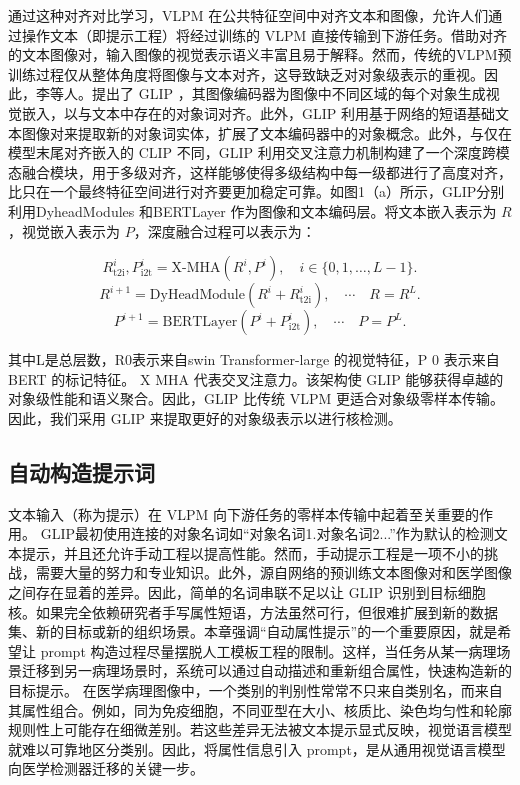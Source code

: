 通过这种对齐对比学习，VLPM 在公共特征空间中对齐文本和图像，允许人们通过操作文本（即提示工程）将经过训练的 VLPM 直接传输到下游任务。借助对齐的文本图像对，输入图像的视觉表示语义丰富且易于解释。然而，传统的VLPM预训练过程仅从整体角度将图像与文本对齐，这导致缺乏对对象级表示的重视。因此，李等人。提出了 GLIP \cite{li2022grounded}，其图像编码器为图像中不同区域的每个对象生成视觉嵌入，以与文本中存在的对象词对齐。此外，GLIP 利用基于网络的短语基础文本图像对来提取新的对象词实体，扩展了文本编码器中的对象概念。此外，与仅在模型末尾对齐嵌入的 CLIP 不同，GLIP 利用交叉注意力机制构建了一个深度跨模态融合模块\cite{chen2021crossvit}，用于多级对齐，这样能够使得多级结构中每一级都进行了高度对齐，比只在一个最终特征空间进行对齐要更加稳定可靠。如图1（a）所示，GLIP分别利用DyheadModules \cite{dai2021dynamic}和BERTLayer \cite{devlin2018bert}作为图像和文本编码层。将文本嵌入表示为 $R$，视觉嵌入表示为 $P$，深度融合过程可以表示为：

\begin{equation}
\label{eq:glip_xmha}
R_{\mathrm{t}2\mathrm{i}}^{i}, P_{\mathrm{i}2\mathrm{t}}^{i}=\mathrm{X\text{-}MHA}\left(R^{i}, P^{i}\right),\quad i \in\{0,1, \ldots, L-1\}.
\end{equation}
\begin{equation}
\label{eq:glip_dyhead}
R^{i+1}=\mathrm{DyHeadModule}\left(R^{i}+R_{\mathrm{t}2\mathrm{i}}^{i}\right),\quad \cdots\quad R=R^{L}.
\end{equation}
\begin{equation}
\label{eq:glip_bert}
P^{i+1}=\mathrm{BERTLayer}\left(P^{i}+P_{\mathrm{i}2\mathrm{t}}^{i}\right),\quad \cdots\quad P=P^{L}.
\end{equation}

其中L是总层数，R0表示来自swin Transformer-large \cite{liu2021swin}的视觉特征，P 0 表示来自BERT \cite{devlin2018bert}的标记特征。 X MHA 代表交叉注意力。该架构使 GLIP 能够获得卓越的对象级性能和语义聚合。因此，GLIP 比传统 VLPM 更适合对象级零样本传输。因此，我们采用 GLIP 来提取更好的对象级表示以进行核检测。

\subsection{自动构造提示词}
文本输入（称为提示）在 VLPM 向下游任务的零样本传输中起着至关重要的作用。 GLIP最初使用连接的对象名词如“对象名词1.对象名词2...”作为默认的检测文本提示，并且还允许手动工程以提高性能\cite{li2022grounded}。然而，手动提示工程是一项不小的挑战，需要大量的努力和专业知识。此外，源自网络的预训练文本图像对和医学图像之间存在显着的差异。因此，简单的名词串联不足以让 GLIP 识别到目标细胞核。如果完全依赖研究者手写属性短语，方法虽然可行，但很难扩展到新的数据集、新的目标或新的组织场景。本章强调“自动属性提示”的一个重要原因，就是希望让 prompt 构造过程尽量摆脱人工模板工程的限制。这样，当任务从某一病理场景迁移到另一病理场景时，系统可以通过自动描述和重新组合属性，快速构造新的目标提示。
在医学病理图像中，一个类别的判别性常常不只来自类别名，而来自其属性组合。例如，同为免疫细胞，不同亚型在大小、核质比、染色均匀性和轮廓规则性上可能存在细微差别。若这些差异无法被文本提示显式反映，视觉语言模型就难以可靠地区分类别。因此，将属性信息引入 prompt，是从通用视觉语言模型向医学检测器迁移的关键一步。

